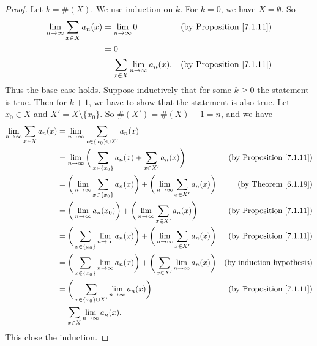\begin{proof}
    Let \(k = \#(X)\).
    We use induction on \(k\).
    For \(k = 0\), we have \(X = \emptyset\).
    So
    \begin{align*}
        \lim_{n \to \infty} \sum_{x \in X} a_n(x) & = \lim_{n \to \infty} 0                      & \text{(by Proposition \ref{7.1.11})} \\
                                                  & = 0                                                                                 \\
                                                  & = \sum_{x \in X} \lim_{n \to \infty} a_n(x). & \text{(by Proposition \ref{7.1.11})}
    \end{align*}
    Thus the base case holds.
    Suppose inductively that for some \(k \geq 0\) the statement is true.
    Then for \(k + 1\), we have to show that the statement is also true.
    Let \(x_0 \in X\) and \(X' = X \setminus \{x_0\}\).
    So \(\#(X') = \#(X) - 1 = n\), and we have
    \begin{align*}
        \lim_{n \to \infty} \sum_{x \in X} a_n(x) & = \lim_{n \to \infty} \sum_{x \in \{x_0\} \cup X'} a_n(x)                                                                                                     \\
                                                  & = \lim_{n \to \infty} \bigg(\sum_{x \in \{x_0\}} a_n(x) + \sum_{x \in X'} a_n(x)\bigg)                                 & \text{(by Proposition \ref{7.1.11})} \\
                                                  & = \bigg(\lim_{n \to \infty} \sum_{x \in \{x_0\}} a_n(x)\bigg) + \bigg(\lim_{n \to \infty} \sum_{x \in X'} a_n(x)\bigg) & \text{(by Theorem \ref{6.1.19})}     \\
                                                  & = \bigg(\lim_{n \to \infty} a_n(x_0)\bigg) + \bigg(\lim_{n \to \infty} \sum_{x \in X'} a_n(x)\bigg)                    & \text{(by Proposition \ref{7.1.11})} \\
                                                  & = \bigg(\sum_{x \in \{x_0\}} \lim_{n \to \infty} a_n(x)\bigg) + \bigg(\lim_{n \to \infty} \sum_{x \in X'} a_n(x)\bigg) & \text{(by Proposition \ref{7.1.11})} \\
                                                  & = \bigg(\sum_{x \in \{x_0\}} \lim_{n \to \infty} a_n(x)\bigg) + \bigg(\sum_{x \in X'} \lim_{n \to \infty} a_n(x)\bigg) & \text{(by induction hypothesis)}     \\
                                                  & = \bigg(\sum_{x \in \{x_0\} \cup X'} \lim_{n \to \infty} a_n(x)\bigg)                                                  & \text{(by Proposition \ref{7.1.11})} \\
                                                  & = \sum_{x \in X} \lim_{n \to \infty} a_n(x).
    \end{align*}
    This close the induction.
\end{proof}